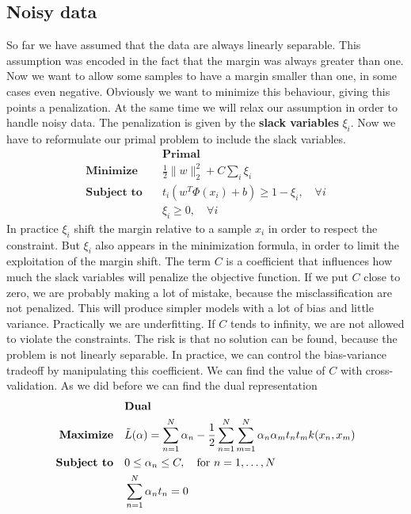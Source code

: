 \documentclass[main.tex]{subfiles}
\begin{document}
\subsection{Noisy data}
So far we have assumed that the data are always linearly separable. This assumption was encoded in the fact that the margin was always greater than one. Now we want to allow some samples to have a margin smaller than one, in some cases even negative. Obviously we want to minimize this behaviour, giving this points a penalization. At the same time we will relax our assumption in order to handle noisy data. The penalization is given by the \textbf{slack variables} $\xi_i$. Now we have to reformulate our primal problem to include the slack variables.
\newpage
\begin{align*}
    &\textbf{Primal} \\
    \textbf{Minimize} \quad &\frac{1}{2} \|w\|_2^2 + C\sum_i \xi_i \\
    \textbf{Subject to} \quad &t_i (w^T \Phi(x_i) + b) \geq 1 - \xi_i, \quad \forall i \\
    &\xi_i \geq 0, \quad \forall i
\end{align*}
In practice $\xi_i$ shift the margin relative to a sample $x_i$ in order to respect the constraint. But $\xi_i$ also appears in the minimization formula, in order to limit the exploitation of the margin shift. The term $C$ is a coefficient that influences how much the slack variables will penalize the objective function. If we put $C$ close to zero, we are probably making a lot of mistake, because the misclassification are not penalized. This will produce simpler models with a lot of bias and little variance. Practically we are underfitting. If $C$ tends to infinity, we are not allowed to violate the constraints. The risk is that no solution can be found, because the problem is not linearly separable. In practice, we can control the bias-variance tradeoff by manipulating this coefficient. We can find the value of $C$ with cross-validation.
As we did before we can find the dual representation
\begin{align*}
    &\textbf{Dual} \\
    \textbf{Maximize} \quad &\Tilde{L}(\alpha) = \sum_{n=1}^N \alpha_n - \frac{1}{2}\sum_{n=1}^N \sum_{m=1}^N \alpha_n \alpha_m t_n t_m k(x_n,x_m) \\
    \textbf{Subject to} \quad &0 \leq \alpha_n \leq C, \quad \text{for } n=1, \dots, N \\
    &\sum_{n=1}^N \alpha_n t_n = 0
\end{align*}
\end{document}
